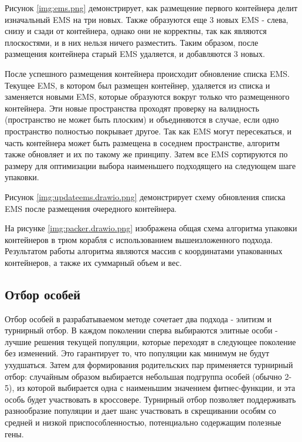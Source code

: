 
\newpage
Рисунок \ref{img:ems.png} демонстрирует, как размещение первого контейнера делит изначальный EMS на три новых. Также образуются еще 3 новых EMS - слева, снизу и сзади от контейнера, однако они не корректны, так как являются плоскостями, и в них нельзя ничего разместить. Таким образом, после размещения контейнера старый EMS удаляется, и добавляются 3 новых.




После успешного размещения контейнера происходит обновление списка EMS. Текущее EMS, в котором был размещен контейнер, удаляется из списка и заменяется новыми EMS, которые образуются вокруг только что размещенного контейнера. Эти новые пространства проходят проверку на валидность (пространство не может быть плоским) и объединяются в случае, если одно пространство полностью покрывает другое. Так как EMS могут пересекаться, и часть контейнера может быть размещена в соседнем пространстве, алгоритм также обновляет и их по такому же принципу.
Затем все EMS сортируются по размеру для оптимизации выбора  наименьшего подходящего на следующем шаге упаковки.

\newpage
Рисунок \ref{img:updateems.drawio.png} демонстрирует схему обновления списка EMS после размещения очередного контейнера.

\newpage
На рисунке \ref{img:packer.drawio.png} изображена общая схема алгоритма упаковки контейнеров в трюм корабля с использованием вышеизложенного подхода. Результатом работы алгоритма являются массив с координатами упакованных контейнеров, а также их суммарный объем и вес.




\newpage
\subsection{Отбор особей}
Отбор особей в разрабатываемом методе сочетает два подхода - элитизм и турнирный отбор. В каждом поколении сперва выбираются элитные особи - лучшие решения текущей популяции, которые переходят в следующее поколение без изменений. Это гарантирует то, что популяции как минимум не будут ухудшаться. Затем для формирования родительских пар применяется турнирный отбор: случайным образом выбирается небольшая подгруппа особей (обычно 2-5), из которой выбирается одна с наименьшим значением фитнес-функции, и эта особь будет участвовать в кроссовере. Турнирный отбор позволяет поддерживать разнообразие популяции и дает шанс участвовать в скрещивании особям со средней и низкой приспособленностью, потенциально содержащим полезные гены.

